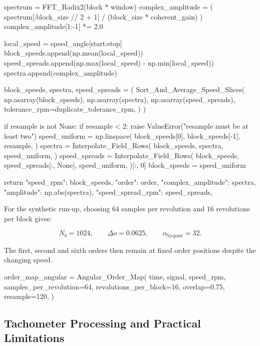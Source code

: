 \begin{python}
        spectrum = FFT_Radix2(block * window)
        complex_amplitude = (
            spectrum[:block_size // 2 + 1]
            / (block_size * coherent_gain)
        )
        complex_amplitude[1:-1] *= 2.0

        local_speed = speed_angle[start:stop]
        block_speeds.append(np.mean(local_speed))
        speed_spreads.append(np.max(local_speed) - np.min(local_speed))
        spectra.append(complex_amplitude)

    block_speeds, spectra, speed_spreads = (
        Sort_And_Average_Speed_Slices(
            np.asarray(block_speeds),
            np.asarray(spectra),
            np.asarray(speed_spreads),
            tolerance_rpm=duplicate_tolerance_rpm,
        )
    )

    if resample is not None:
        if resample < 2:
            raise ValueError("resample must be at least two")
        speed_uniform = np.linspace(
            block_speeds[0],
            block_speeds[-1],
            resample,
        )
        spectra = Interpolate_Field_Rows(
            block_speeds,
            spectra,
            speed_uniform,
        )
        speed_spreads = Interpolate_Field_Rows(
            block_speeds,
            speed_spreads[:, None],
            speed_uniform,
        )[:, 0]
        block_speeds = speed_uniform

    return {
        "speed_rpm": block_speeds,
        "order": order,
        "complex_amplitude": spectra,
        "amplitude": np.abs(spectra),
        "speed_spread_rpm": speed_spreads,
    }
\end{python}

For the synthetic run-up, choosing $ 64 $ samples per revolution and $ 16 $
revolutions per block gives:

\begin{equation}
    N_b=1024,
    \qquad
    \Delta o=0.0625,
    \qquad
    o_{\mathrm{Nyquist}}=32.
\end{equation}

The first, second and sixth orders then remain at fixed order positions despite
the changing speed.

\begin{python}
order_map_angular = Angular_Order_Map(
    time,
    signal,
    speed_rpm,
    samples_per_revolution=64,
    revolutions_per_block=16,
    overlap=0.75,
    resample=120,
)
\end{python}

\subsection{Tachometer Processing and Practical Limitations}

